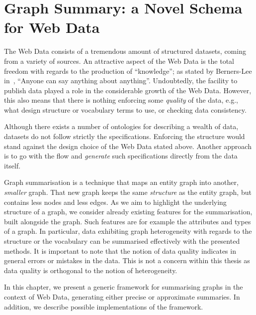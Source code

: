 \chapter{Graph Summary: a Novel Schema for Web Data}
\label{chap:summary}

The Web Data consists of a tremendous amount of structured datasets, coming from a variety of sources. An attractive aspect of the Web Data is the total freedom with regards to the production of ``knowledge''; as stated by Berners-Lee in~\cite{tbl:1997:wam}, ``Anyone can say anything about anything''. Undoubtedly, the facility to publish data played a role in the considerable growth of the Web Data. However, this also means that there is nothing enforcing some \emph{quality} of the data, e.g., what design structure or vocabulary terms to use, or checking data consistency.

Although there exists a number of ontologies for describing a wealth of data, datasets do not follow strictly the specifications. Enforcing the structure would stand against the design choice of the Web Data stated above. Another approach is to go with the flow and \emph{generate} such specifications directly from the data itself.

Graph summarisation is a technique that maps an entity graph into another, \emph{smaller} graph. That new graph keeps the same \emph{structure} as the entity graph, but contains less nodes and less edges. %
As we aim to highlight the underlying structure of a graph, we consider already existing features for the summarisation, built alongside the graph. Such features are for example the \gls{attributes} and \gls{types} of a graph.
In particular, data exhibiting graph heterogeneity with regards to the structure or the vocabulary can be summarised effectively with the presented methods. It is important to note that the notion of data quality indicates in general errors or mistakes in the data. This is not a concern within this thesis as data quality is orthogonal to the notion of heterogeneity.

In this chapter, we present a generic framework for summarising graphs in the context of Web Data, generating either precise or approximate summaries. In addition, we describe possible implementations of the framework.
